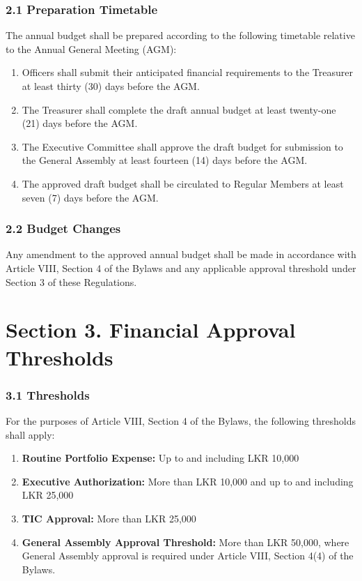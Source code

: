\documentclass[a4paper]{article}
\begin{document}
\subsubsection*{2.1 Preparation Timetable}
The annual budget shall be prepared according to the following
timetable relative to the Annual General Meeting (AGM):
\begin{enumerate}
    \item Officers shall submit their anticipated financial requirements
    to the Treasurer at least thirty (30) days before the AGM.
    \item The Treasurer shall complete the draft annual budget at least
    twenty-one (21) days before the AGM.
    \item The Executive Committee shall approve the draft budget for
    submission to the General Assembly at least fourteen (14) days
    before the AGM.
    \item The approved draft budget shall be circulated to Regular
    Members at least seven (7) days before the AGM.
\end{enumerate}

\subsubsection*{2.2 Budget Changes}
Any amendment to the approved annual budget shall be made in accordance
with Article VIII, Section 4 of the Bylaws and any applicable approval
threshold under Section 3 of these Regulations.

\section*{Section 3. Financial Approval Thresholds}

\subsubsection*{3.1 Thresholds}
For the purposes of Article VIII, Section 4 of the Bylaws, the following
thresholds shall apply:

\begin{enumerate}
    \item \textbf{Routine Portfolio Expense:} Up to and including
    LKR 10,000

    \item \textbf{Executive Authorization:} More than LKR 10,000 and
    up to and including LKR 25,000

    \item \textbf{TIC Approval:} More than LKR 25,000

    \item \textbf{General Assembly Approval Threshold:} More than
    LKR 50,000, where General Assembly approval is required under
    Article VIII, Section 4(4) of the Bylaws.
\end{enumerate}
\end{document}

